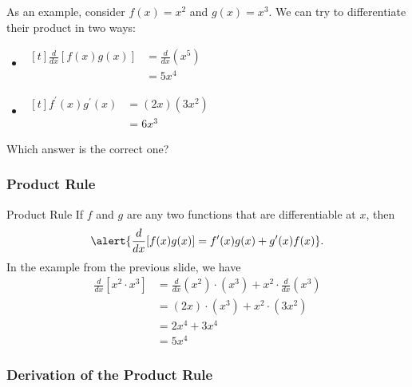 \documentclass[cal1spr16Lectures.tex]{subfiles}
\begin{document}
\begin{frame}\footnotesize
As an example, consider $f(x)=x^2$ and $g(x)=x^3$.  We can try to differentiate their product in two ways:
\begin{itemize}\footnotesize
\item $\begin{aligned}[t]
	\frac{d}{dx}[f(x)g(x)] &= \frac{d}{dx}\left(x^5 \right) \\[0.25pc]
	 &= 5x^4
	\end{aligned}$
\item $\begin{aligned}[t]
	f^{\prime}(x)g^{\prime}(x) &= (2x)(3x^2) \\
	 &= 6x^3
	 \end{aligned}$
\end{itemize}
\begin{que}Which answer is the correct one? \end{que}
\end{frame}

\subsubsection{Product Rule}

\begin{frame}{\small Product Rule}\footnotesize
If $f$ and $g$ are any two functions that are differentiable at $x$, then
\[\alert{\frac{d}{dx}[f(x) g(x)] = f^{\prime}(x) g(x) + g^{\prime}(x) f(x)}.\]
In the example from the previous slide, we have
\begin{align*}
\frac{d}{dx}[x^2\cdot x^3] &= \frac{d}{dx}(x^2)\cdot (x^3)+x^2\cdot\frac{d}{dx}(x^3) \\
 &= (2x)\cdot (x^3)+x^2\cdot (3x^2) \\[0.25pc]
 &= 2x^4+3x^4 \\[0.25pc]
 &= 5x^4
\end{align*}
\end{frame}

\subsubsection{Derivation of the Product Rule}
\end{document}
